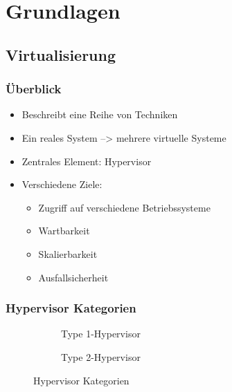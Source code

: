 \documentclass[]{beamer}
\newcommand{\inputImage}[1]{}
\begin{document}
\section{Grundlagen}
\label{sec:grundlagen}

\subsection{Virtualisierung}
\begin{frame}
\frametitle{Überblick}
    \begin{itemize}
        \item Beschreibt eine Reihe von Techniken
        \item Ein reales System --> mehrere virtuelle Systeme
        \item Zentrales Element: Hypervisor
        \item Verschiedene Ziele:
        \begin{itemize}
            \item Zugriff auf verschiedene Betriebssysteme
            \item Wartbarkeit
            \item Skalierbarkeit
            \item Ausfallsicherheit
        \end{itemize}
    \end{itemize}
\end{frame}

\begin{frame}
\frametitle{Hypervisor Kategorien}
    \begin{figure}
        \centering
        \begin{subfigure}[b]{0.49\textwidth}
            \centering
            \resizebox{0.9\linewidth}{!}{\inputImage{virt_type1.dia}}
            \caption{Type 1-Hypervisor}
            \label{fig:hypervisor_type1}
        \end{subfigure}
        \begin{subfigure}[b]{0.49\textwidth}
            \centering
            \resizebox{0.9\linewidth}{!}{\inputImage{virt_type2.dia}}
            \caption{Type 2-Hypervisor}
            \label{fig:hypervisor_type2}
        \end{subfigure}
        \caption{Hypervisor Kategorien}
        \label{fig:hypervisor}
    \end{figure}
\end{frame}
\end{document}
